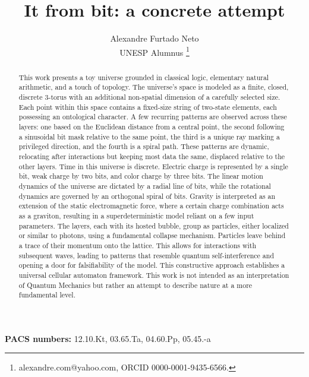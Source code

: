 \documentclass[12pt,english]{article}
\begin{document}
\title{It from bit: a concrete attempt}
\author{Alexandre Furtado Neto \\ UNESP Alumnus \thanks{alexandre.com@yahoo.com, ORCID 0000-0001-9435-6566.}}
\maketitle

\begin{abstract}
This work presents a toy universe grounded in classical logic, elementary natural arithmetic, and a touch of topology. The universe’s space is modeled as a finite, closed, discrete 3-torus with an additional non-spatial dimension of a carefully selected size. Each point within this space contains a fixed-size string of two-state elements, each possessing an ontological character. A few recurring patterns are observed across these layers: one based on the Euclidean distance from a central point, the second following a sinusoidal bit mask relative to the same point, the third is a unique ray marking a privileged direction, and the fourth is a spiral path. These patterns are dynamic, relocating after interactions but keeping most data the same, displaced relative to the other layers. Time in this universe is discrete. Electric charge is represented by a single bit, weak charge by two bits, and color charge by three bits. The linear motion dynamics of the universe are dictated by a radial line of bits, while the rotational dynamics are governed by an orthogonal spiral of bits. Gravity is interpreted as an extension of the static electromagnetic force, where a certain charge combination acts as a graviton, resulting in a superdeterministic model reliant on a few input parameters. The layers, each with its hosted bubble, group as particles, either localized or similar to photons, using a fundamental collapse mechanism. Particles leave behind a trace of their momentum onto the lattice. This allows for interactions with subsequent waves, leading to patterns that resemble quantum self-interference and opening a door for falsifiability of the model. This constructive approach establishes a universal cellular automaton framework.  This work is not intended as an interpretation of Quantum Mechanics but rather an attempt to describe nature at a more fundamental level.

\medskip{}
\end{abstract}

\vfill

\begin{center}
\textbf{PACS numbers: }12.10.Kt, 03.65.Ta, 04.60.Pp, 05.45.-a
\par\end{center}
\end{document}
